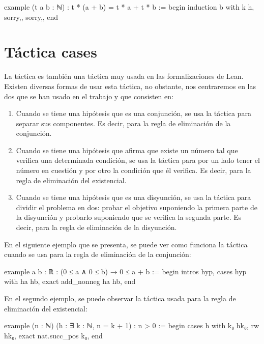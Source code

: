 \begin{leancode}
example (t a b : ℕ) : t * (a + b) = t * a + t * b :=
begin
  induction b with k h,
  {sorry,},
  {sorry,},
end
\end{leancode}

\section{Táctica cases}

La táctica  es también una táctica muy usada en las
formalizaciones de Lean. Existen diversas formas de usar esta táctica, no
obstante, nos centraremos en las dos que se han usado en el trabajo y que
consisten en:
\begin{enumerate}
\item Cuando se tiene una hipótesis que es una conjunción, se usa la
  táctica  para separar sus componentes. Es decir,
  para la regla de eliminación de la conjunción.

\item Cuando se tiene una hipótesis que afirma que existe un número tal que
  verifica una determinada condición, se usa la táctica 
  para por un lado tener el número en cuestión y por otro la condición que él
  verifica. Es decir, para la regla de eliminación del existencial.

\item Cuando se tiene una hipótesis que es una disyunción, se usa la táctica
   para dividir el problema en dos: probar el objetivo
  suponiendo la primera parte de la disyunción y probarlo suponiendo que
  se verifica la segunda parte. Es decir, para la regla de eliminación
  de la disyunción.
\end{enumerate}

En el siguiente ejemplo que se presenta, se puede ver como funciona la táctica
 cuando se usa para la regla de eliminación de la
conjunción:

\begin{leancode}
example {a b : ℝ} : (0 ≤ a ∧ 0 ≤ b) → 0 ≤ a + b :=
begin
  intros hyp,
  cases hyp with ha hb,
  exact add_nonneg ha hb,
end
\end{leancode}

En el segundo ejemplo, se puede observar la táctica 
usada para la regla de eliminación del existencial:
\begin{leancode}
example (n : ℕ) (h : ∃ k : ℕ, n = k + 1) : n > 0 :=
begin
  cases h with k₀ hk₀,
  rw hk₀,
  exact nat.succ_pos k₀,
end
\end{leancode}

